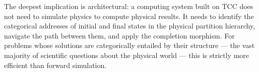 \documentclass[12pt,twocolumn]{article}
\begin{document}
The deepest implication is architectural: a computing system built on TCC does not need to simulate physics to compute physical results. It needs to identify the categorical addresses of initial and final states in the physical partition hierarchy, navigate the path between them, and apply the completion morphism. For problems whose solutions are categorically entailed by their structure --- the vast majority of scientific questions about the physical world --- this is strictly more efficient than forward simulation.



\end{document}
